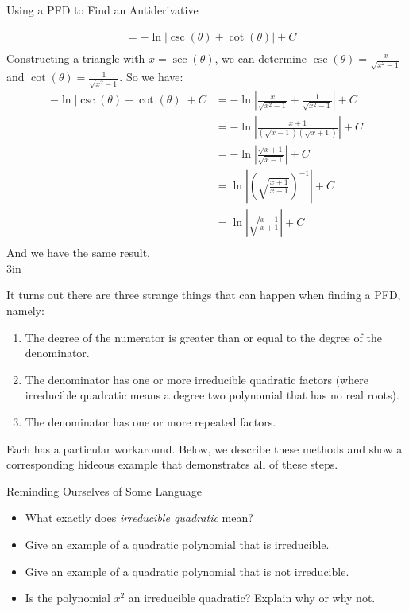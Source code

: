 \begin{exercise}{Using a PFD to Find an Antiderivative \Coffeecup \Coffeecup }
\begin{itemize}
{\begin{align*}
&=-\ln|\csc(\theta)+\cot(\theta)|+C\\
\end{align*}
Constructing a triangle with $x=\sec(\theta)$, we can determine $\csc(\theta)=\frac{x}{\sqrt{x^2-1}}$ and $\cot(\theta)=\frac{1}{\sqrt{x^2-1}}$. So we have:
\begin{align*}
-\ln|\csc(\theta)+\cot(\theta)|+C&=-\ln\left|\frac{x}{\sqrt{x^2-1}}+\frac{1}{\sqrt{x^2-1}}\right|+C\\
&=-\ln\left|\frac{x+1}{(\sqrt{x-1})(\sqrt{x+1})}
\right|+C\\
&=-\ln\left|\frac{\sqrt{x+1}}{\sqrt{x-1}}\right|+C\\
&=\ln\left|\left(\sqrt{\frac{x+1}{x-1}}\right)^{-1}\right|+C\\
&=\ln\left|\sqrt{\frac{x-1}{x+1}}\right|+C\\
\end{align*}
And we have the same result.\\
}{3in}
\end{itemize}
\end{exercise}
It turns out there are three strange things that can happen when finding a PFD, namely: 
\begin{enumerate}
\item The degree of the numerator is greater than or equal to the degree of the denominator. 
\item The denominator has one or more irreducible quadratic factors (where irreducible quadratic means a degree two polynomial that has no real roots).
\item The denominator has one or more repeated factors.
\end{enumerate}

Each has a particular workaround.  Below, we describe these methods and show a corresponding hideous example that demonstrates all of these steps.  

\begin{exercise}{Reminding Ourselves of Some Language \Coffeecup}
\begin{itemize}
\item What exactly does \emph{irreducible quadratic} mean?
\item Give an example of a quadratic polynomial that is irreducible.
\item Give an example of a quadratic polynomial that is not irreducible.
\item Is the polynomial $x^2$ an irreducible quadratic?  Explain why or why not.
\vspace*{.5in}
\end{itemize}
\end{exercise}



